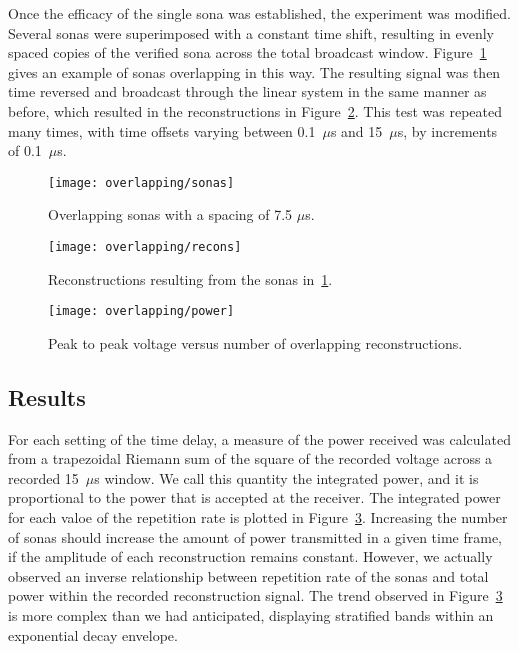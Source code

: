 Once the efficacy of the single sona was established, the experiment was modified. Several sonas were superimposed with a constant time shift, resulting in evenly spaced copies of the verified sona across the total broadcast window. Figure~\ref{fig:overlapping-sonas} gives an example of sonas overlapping in this way. The resulting signal was then time reversed and broadcast through the linear system in the same manner as before, which resulted in the reconstructions in Figure~\ref{fig:overlapping-recons}. This test was repeated many times, with time offsets varying between 0.1~$\mu$s and 15~$\mu$s, by increments of 0.1~$\mu$s.

\begin{figure}[t]
\centering
\texttt{[image: overlapping/sonas]}
\caption[Overlapping sonas]{Overlapping sonas with a spacing of 7.5 $\mu$s.}
\label{fig:overlapping-sonas}
\end{figure}

\begin{figure}[t]
\centering
\texttt{[image: overlapping/recons]}
\caption[Overlapping reconstructions]{Reconstructions resulting from the sonas in~\ref{fig:overlapping-sonas}.}
\label{fig:overlapping-recons}
\end{figure}

\begin{figure}[t]
\centering
\texttt{[image: overlapping/power]}
\caption[Max Vpp from overlapping reconstructions]{Peak to peak voltage versus number of overlapping reconstructions.}
\label{fig:overlapping-power}
\end{figure}

\subsection{Results}

For each setting of the time delay, a measure of the power received was calculated from a trapezoidal Riemann sum of the square of the recorded voltage across a recorded 15~$\mu$s window. We call this quantity the integrated power, and it is proportional to the power that is accepted at the receiver. The integrated power for each valoe of the repetition rate is plotted in Figure~\ref{fig:overlapping-power}. Increasing the number of sonas should increase the amount of power transmitted in a given time frame, if the amplitude of each reconstruction remains constant. However, we actually observed an inverse relationship between repetition rate of the sonas and total power within the recorded reconstruction signal. The trend observed in Figure~\ref{fig:overlapping-power} is more complex than we had anticipated, displaying stratified bands within an exponential decay envelope. 


